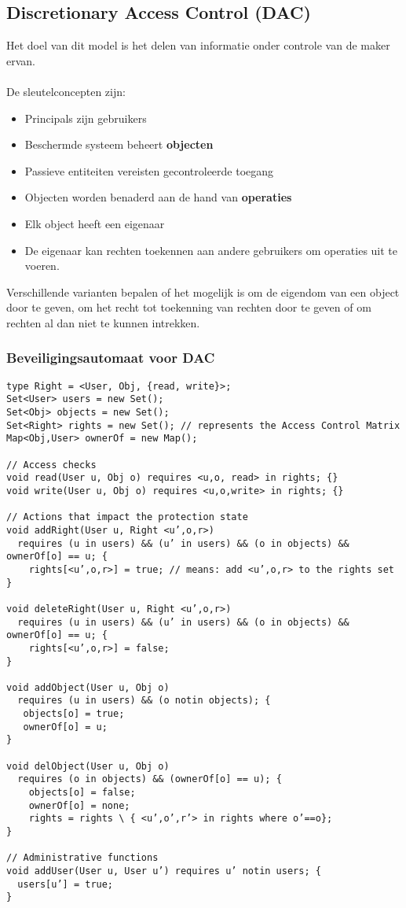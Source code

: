\documentclass[../main.tex]{subfiles}
\begin{document}
\subsection{Discretionary Access Control (DAC)}
Het doel van dit model is het delen van informatie onder controle van de maker ervan.
\\\\
De sleutelconcepten zijn:
\begin{multicols}{2}
\begin{itemize}
	\item Principals zijn gebruikers
	\item Beschermde systeem beheert \textbf{objecten}
	\item Passieve entiteiten vereisten gecontroleerde toegang
	\item Objecten worden benaderd aan de hand van \textbf{operaties}
	\item Elk object heeft een eigenaar
	\item De eigenaar kan rechten toekennen aan andere gebruikers om operaties uit te voeren.
\end{itemize}
\end{multicols}
\noindent
Verschillende varianten bepalen of het mogelijk is om de eigendom van een object door te geven, om het recht tot toekenning van rechten door te geven of om rechten al dan niet te kunnen intrekken.

\subsubsection{Beveiligingsautomaat voor DAC}
\begin{lstlisting}[caption=DAC Automaat]
type Right = <User, Obj, {read, write}>;
Set<User> users = new Set();
Set<Obj> objects = new Set();
Set<Right> rights = new Set(); // represents the Access Control Matrix
Map<Obj,User> ownerOf = new Map();

// Access checks
void read(User u, Obj o) requires <u,o, read> in rights; {}
void write(User u, Obj o) requires <u,o,write> in rights; {}

// Actions that impact the protection state
void addRight(User u, Right <u’,o,r>)
  requires (u in users) && (u’ in users) && (o in objects) && ownerOf[o] == u; {
    rights[<u’,o,r>] = true; // means: add <u’,o,r> to the rights set
}

void deleteRight(User u, Right <u’,o,r>)
  requires (u in users) && (u’ in users) && (o in objects) && ownerOf[o] == u; {
    rights[<u’,o,r>] = false;
}

void addObject(User u, Obj o)
  requires (u in users) && (o notin objects); {
   objects[o] = true;
   ownerOf[o] = u;
}

void delObject(User u, Obj o)
  requires (o in objects) && (ownerOf[o] == u); {
    objects[o] = false;
    ownerOf[o] = none;
    rights = rights \ { <u’,o’,r’> in rights where o’==o};
}

// Administrative functions
void addUser(User u, User u’) requires u’ notin users; {
  users[u’] = true;
}
\end{lstlisting}
\end{document}
